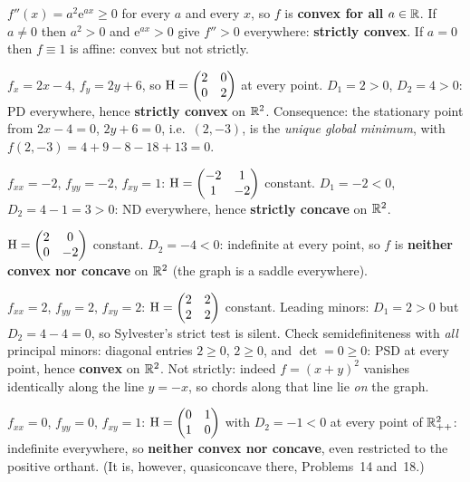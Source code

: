 \begin{solutions}
  \item $f''(x)=a^{2}\mathrm{e}^{ax}\ge0$ for every $a$ and every $x$, so
        $f$ is \textbf{convex for all} $a\in\mathbb{R}$. If $a\neq0$ then
        $a^{2}>0$ and $\mathrm{e}^{ax}>0$ give $f''>0$ everywhere:
        \textbf{strictly convex}. If $a=0$ then $f\equiv1$ is affine:
        convex but not strictly.

  \item $f_x=2x-4$, $f_y=2y+6$, so
        $\operatorname{H}=\begin{pmatrix}2&0\\0&2\end{pmatrix}$ at every point.
        $D_1=2>0$, $D_2=4>0$: PD everywhere, hence \textbf{strictly
        convex} on $\mathbb{R}^{2}$. Consequence: the stationary point from
        $2x-4=0$, $2y+6=0$, i.e.\ $(2,-3)$, is the \emph{unique global
        minimum}, with $f(2,-3)=4+9-8-18+13=0$.

  \item $f_{xx}=-2$, $f_{yy}=-2$, $f_{xy}=1$:
        $\operatorname{H}=\begin{pmatrix}-2&1\\1&-2\end{pmatrix}$ constant.
        $D_1=-2<0$, $D_2=4-1=3>0$: ND everywhere, hence
        \textbf{strictly concave} on $\mathbb{R}^{2}$.

  \item $\operatorname{H}=\begin{pmatrix}2&0\\0&-2\end{pmatrix}$ constant.
        $D_2=-4<0$: indefinite at every point, so $f$ is
        \textbf{neither convex nor concave} on $\mathbb{R}^{2}$ (the graph is a
        saddle everywhere).

  \item $f_{xx}=2$, $f_{yy}=2$, $f_{xy}=2$:
        $\operatorname{H}=\begin{pmatrix}2&2\\2&2\end{pmatrix}$ constant. Leading
        minors: $D_1=2>0$ but $D_2=4-4=0$, so Sylvester's strict test is
        silent. Check semidefiniteness with \emph{all} principal minors:
        diagonal entries $2\ge0$, $2\ge0$, and $\det=0\ge0$: PSD at every
        point, hence \textbf{convex} on $\mathbb{R}^{2}$. Not strictly: indeed
        $f=(x+y)^{2}$ vanishes identically along the line $y=-x$, so
        chords along that line lie \emph{on} the graph.

  \item $f_{xx}=0$, $f_{yy}=0$, $f_{xy}=1$:
        $\operatorname{H}=\begin{pmatrix}0&1\\1&0\end{pmatrix}$ with
        $D_2=-1<0$ at every point of $\mathbb{R}^{2}_{++}$: indefinite everywhere,
        so \textbf{neither convex nor concave}, even restricted to the
        positive orthant. (It is, however, quasiconcave there,
        Problems~14 and~18.)


\end{solutions}
